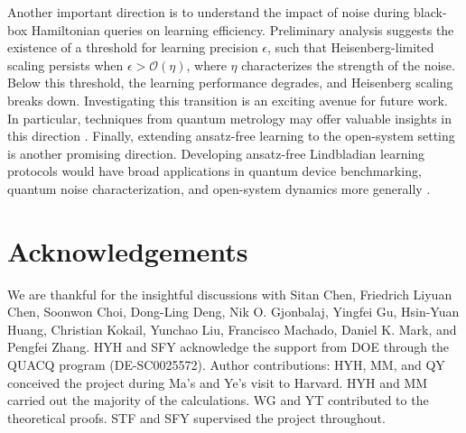 \documentclass[twocolumn,superscriptaddress,aps,showpacs,amsmath,amstex,amssymb,citeautoscript,floatfix,pra,preprintnumbers]{revtex4-2}
\theoremstyle{plain}
\theoremstyle{plain}
\theoremstyle{plain}
\theoremstyle{plain}
\theoremstyle{plain}
\theoremstyle{plain}
\begin{document}
Another important direction is to understand the impact of noise during black-box Hamiltonian queries on learning efficiency. Preliminary analysis suggests the existence of a threshold for learning precision $\epsilon$, such that Heisenberg-limited scaling persists when $\epsilon> \mathcal{O}(\eta)$, where $\eta$ characterizes the strength of the noise. Below this threshold, the learning performance degrades, and Heisenberg scaling breaks down. Investigating this transition is an exciting avenue for future work. In particular, techniques from quantum metrology may offer valuable insights in this direction \cite{MetrologyQEC,EnhancedSensing}. Finally, extending ansatz-free learning to the open-system setting is another promising direction. Developing ansatz-free Lindbladian learning protocols would have broad applications in quantum device benchmarking, quantum noise characterization, and open-system dynamics more generally \cite{2024arXiv240803376S,PhysRevA.105.032435}.



\section{Acknowledgements} 
We are thankful for the insightful discussions with Sitan Chen, Friedrich Liyuan Chen, Soonwon Choi, Dong-Ling Deng, Nik O. Gjonbalaj, Yingfei Gu, Hsin-Yuan Huang, Christian Kokail, Yunchao Liu, Francisco Machado, Daniel K. Mark, and Pengfei Zhang. HYH and SFY acknowledge the support from DOE through the QUACQ
program (DE-SC0025572). Author contributions: HYH, MM, and QY conceived the project during Ma’s and Ye’s visit to Harvard. HYH and MM carried out the majority of the calculations. WG and YT contributed to the theoretical proofs. STF and SFY supervised the project throughout.


\newpage

\let\oldaddcontentsline\addcontentsline
\renewcommand{\addcontentsline}[3]{}
% 

\let\addcontentsline\oldaddcontentsline
\clearpage
\newpage


\onecolumngrid 
\end{document}

